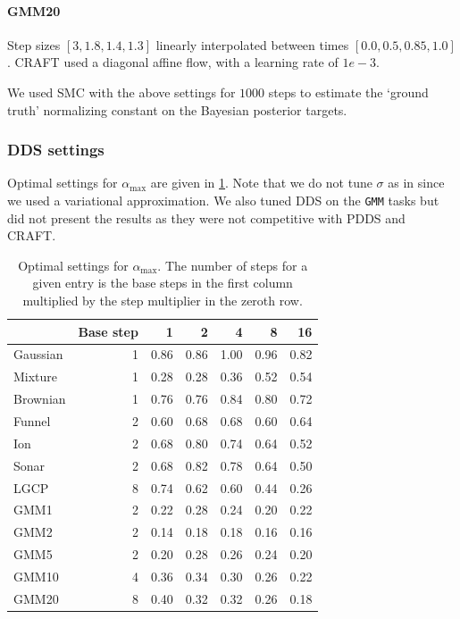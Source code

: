 \documentclass{article}
\theoremstyle{plain}
\theoremstyle{definition}
\theoremstyle{remark}
\begin{document}
\paragraph{GMM20} Step sizes $[3, 1.8, 1.4, 1.3]$ linearly interpolated between times $[0.0, 0.5, 0.85, 1.0]$. CRAFT used a diagonal affine flow, with a learning rate of $1e-3$.


We used SMC with the above settings for $1000$ steps to estimate the `ground truth' normalizing constant on the Bayesian posterior targets.

\subsubsection{DDS settings}
Optimal settings for $\alpha_\text{max}$ are given in \cref{tab:dds_settings}. Note that we do not tune $\sigma$ as in \citet{vargasDDSampler2023} since we used a variational approximation. We also tuned DDS on the \verb|GMM| tasks but did not present the results as they were not competitive with PDDS and CRAFT.

\begin{table}[]
	\centering
	\begin{tabular}{lrrrrrr}
		\toprule
		         & Base step & 1    & 2    & 4    & 8    & 16   \\
		\midrule
		Gaussian & 1         & 0.86 & 0.86 & 1.00 & 0.96 & 0.82 \\
		Mixture  & 1         & 0.28 & 0.28 & 0.36 & 0.52 & 0.54 \\
		Brownian & 1         & 0.76 & 0.76 & 0.84 & 0.80 & 0.72 \\
		Funnel   & 2         & 0.60 & 0.68 & 0.68 & 0.60 & 0.64 \\
		Ion      & 2         & 0.68 & 0.80 & 0.74 & 0.64 & 0.52 \\
		Sonar    & 2         & 0.68 & 0.82 & 0.78 & 0.64 & 0.50 \\
		LGCP     & 8         & 0.74 & 0.62 & 0.60 & 0.44 & 0.26 \\
		GMM1     & 2         & 0.22 & 0.28 & 0.24 & 0.20 & 0.22 \\
		GMM2     & 2         & 0.14 & 0.18 & 0.18 & 0.16 & 0.16 \\
		GMM5     & 2         & 0.20 & 0.28 & 0.26 & 0.24 & 0.20 \\
		GMM10    & 4         & 0.36 & 0.34 & 0.30 & 0.26 & 0.22 \\
		GMM20    & 8         & 0.40 & 0.32 & 0.32 & 0.26 & 0.18 \\
		\bottomrule
	\end{tabular}
	\caption{Optimal settings for $\alpha_\text{max}$. The number of steps for a given entry is the base steps in the first column multiplied by the step multiplier in the zeroth row.}
	\label{tab:dds_settings}
\end{table}
\end{document}
